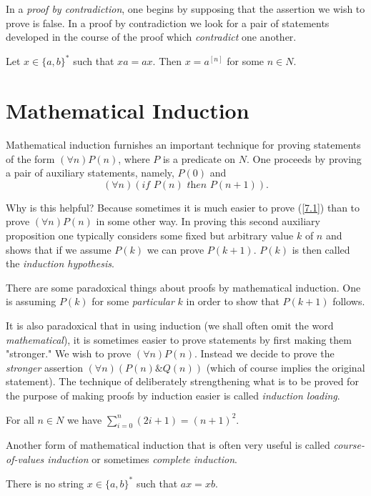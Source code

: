 \documentclass[12pt,a4paper,twoside,openany]{book}
\begin{document}
In a \textit{proof by contradiction}, one begins by supposing that the assertion we wish to prove is false. In a proof by contradiction we look for a pair of statements developed in the course of the proof which \textit{contradict} one another.

\thm{} {
    Let $x\in\{a,b\}^*$ such that $xa=ax$. Then $x=a^{[n]}$ for some $n\in N$.
}

\section{Mathematical Induction}

Mathematical induction furnishes an important technique for proving statements of the form $(\forall n)P(n)$, where $P$ is a predicate on $N$. One proceeds by proving a pair of auxiliary statements, namely, $P(0)$ and
\begin{equation}
    (\forall n)(\textit{if }P(n)\textit{ then }P(n+1)).
    \label{7.1}
\end{equation}

Why is this helpful? Because sometimes it is much easier to prove (\ref{7.1}) than to prove $(\forall n)P(n)$ in some other way. In proving this second auxiliary proposition one typically considers some fixed but arbitrary value $k$ of $n$ and shows that if we assume $P(k)$ we can prove $P(k+1)$. $P(k)$ is then called the \textit{induction hypothesis}.

There are some paradoxical things about proofs by mathematical induc­tion. One is assuming $P(k)$ for some \textit{particular} $k$ in order to show that $P(k+1)$ follows.

It is also paradoxical that in using induction (we shall often omit the word \textit{mathematical}), it is sometimes easier to prove statements by first making them "stronger." We wish to prove $(\forall n)P(n)$. Instead we decide to prove the \textit{stronger} assertion $(\forall n)(P(n)\&Q(n))$ (which of course implies the original statement). The technique of deliber­ately strengthening what is to be proved for the purpose of making proofs by induction easier is called \textit{induction loading}.

\thm{} {
    For all $n\in N$ we have $\sum_{i = 0}^n(2i + 1)=(n + 1)^2$.
}

Another form of mathematical induction that is often very useful is called \textit{course-of-values induction} or sometimes \textit{complete induction}.

\thm{} {
    There is no string $x\in\{a,b\}^*$ such that $ax=xb$.
}
\end{document}
